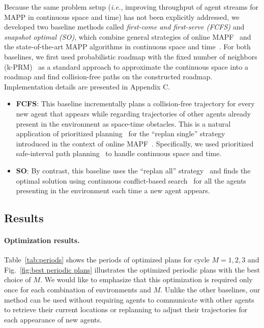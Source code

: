 \documentclass[letterpaper]{article} %
\def\ie{{\it i.e.}}
\begin{document}
Because the same problem setup (\ie, improving throughput of agent streams for MAPP in continuous space and time) has not been explicitly addressed, we developed two baseline methods called \emph{first-come and first-serve (FCFS)} and \emph{snapshot optimal (SO)}, which combine general strategies of online MAPF~\cite{vsvancara2019online} and the state-of-the-art MAPP algorithms in continuous space and time~\cite{andreychuk2022multi,kasaura2022prioritized}. For both baselines, we first used probabilistic roadmap with the fixed number of neighbors (k-PRM)~\cite{karaman2011sampling} as a standard approach to approximate the continuous space into a roadmap and find collision-free paths on the constructed roadmap.
Implementation details are presented in Appendix C.
\begin{itemize}
    \item \textbf{FCFS}: This baseline incrementally plans a collision-free trajectory for every new agent that appears while regarding trajectories of other agents already present in the environment as space-time obstacles. This is a natural application of prioritized planning~\cite{silver2005cooperative} for the ``replan single'' strategy introduced in the context of online MAPF~\cite{vsvancara2019online}. Specifically, we used prioritized safe-interval path planning~\cite{kasaura2022prioritized} to handle continuous space and time.
    \item \textbf{SO}: By contrast, this baseline uses the ``replan all'' strategy~\cite{vsvancara2019online} and finds the optimal solution using continuous conflict-based search~\cite{andreychuk2022multi} for all the agents presenting in the environment each time a new agent appears.
\end{itemize}


\subsection{Results}

\paragraph{Optimization results.}
Table~\ref{tab:periods} shows the periods of optimized plans for cycle $M=1, 2, 3$ and Fig.~\ref{fig:best periodic plans} illustrates the optimized periodic plans with the best choice of $M$. We would like to emphasize that this optimization is required only once for each combination of environments and $M$. Unlike the other baselines, our method can be used without requiring agents to communicate with other agents to retrieve their current locations or replanning to adjust their trajectories for each appearance of new agents.
\end{document}
